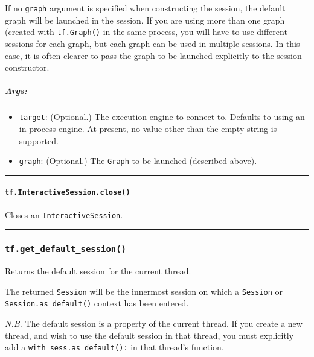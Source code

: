 If no \texttt{graph} argument is specified when constructing the
session, the default graph will be launched in the session. If you are
using more than one graph (created with \texttt{tf.Graph()} in the same
process, you will have to use different sessions for each graph, but
each graph can be used in multiple sessions. In this case, it is often
clearer to pass the graph to be launched explicitly to the session
constructor.

\subparagraph{Args: }\label{args-2}

\begin{itemize}
\tightlist
\item
  \texttt{target}: (Optional.) The execution engine to connect to.
  Defaults to using an in-process engine. At present, no value other
  than the empty string is supported.
\item
  \texttt{graph}: (Optional.) The \texttt{Graph} to be launched
  (described above).
\end{itemize}

\begin{center}\rule{0.5\linewidth}{\linethickness}\end{center}

\paragraph{\texorpdfstring{\texttt{tf.InteractiveSession.close()}
}{tf.InteractiveSession.close() }}\label{tf.interactivesession.close}

Closes an \texttt{InteractiveSession}.

\begin{center}\rule{0.5\linewidth}{\linethickness}\end{center}

\subsubsection{\texorpdfstring{\texttt{tf.get\_default\_session()}
}{tf.get\_default\_session() }}\label{tf.getux5fdefaultux5fsession}

Returns the default session for the current thread.

The returned \texttt{Session} will be the innermost session on which a
\texttt{Session} or \texttt{Session.as\_default()} context has been
entered.

\emph{N.B.} The default session is a property of the current thread. If
you create a new thread, and wish to use the default session in that
thread, you must explicitly add a \texttt{with\ sess.as\_default():} in
that thread's function.

